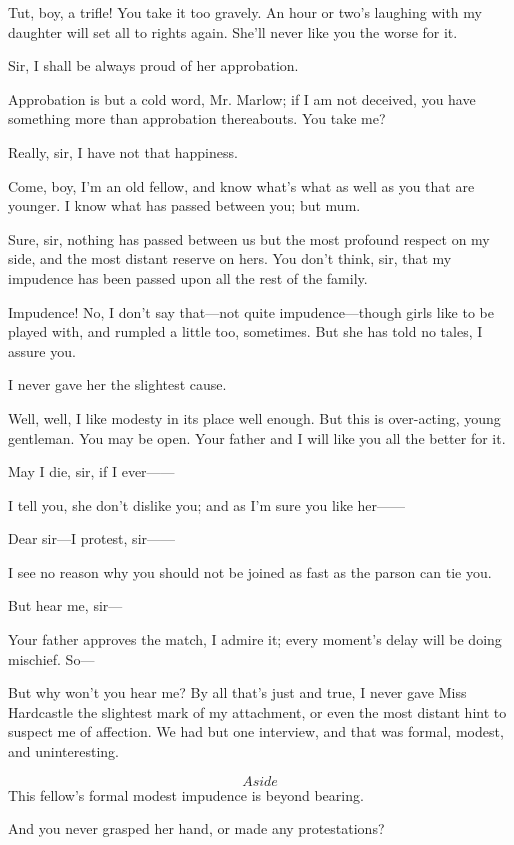 \documentclass{book}
\begin{document}
\3  Tut, boy, a trifle!  You take it too gravely.  An hour or
two's laughing with my daughter will set all to rights again.  She'll
never like you the worse for it.

\2  Sir, I shall be always proud of her approbation.

\3  Approbation is but a cold word, Mr. Marlow; if I am not
deceived, you have something more than approbation thereabouts.  You
take me?

\2  Really, sir, I have not that happiness.

\3  Come, boy, I'm an old fellow, and know what's what as well
as you that are younger.  I know what has passed between you; but mum.

\2  Sure, sir, nothing has passed between us but the most
profound respect on my side, and the most distant reserve on hers.  You
don't think, sir, that my impudence has been passed upon all the rest
of the family.

\3  Impudence!  No, I don't say that---not quite
impudence---though girls like to be played with, and rumpled a little
too, sometimes.  But she has told no tales, I assure you.

\2  I never gave her the slightest cause.

\3  Well, well, I like modesty in its place well enough.  But
this is over-acting, young gentleman.  You may be open.  Your father
and I will like you all the better for it.

\2  May I die, sir, if I ever------

\3  I tell you, she don't dislike you; and as I'm sure you
like her------

\2  Dear sir---I protest, sir------

\3  I see no reason why you should not be joined as fast as
the parson can tie you.

\2  But hear me, sir---

\3  Your father approves the match, I admire it; every
moment's delay will be doing mischief.  So---

\2  But why won't you hear me?  By all that's just and true, I
never gave Miss Hardcastle the slightest mark of my attachment, or even
the most distant hint to suspect me of affection.  We had but one
interview, and that was formal, modest, and uninteresting.

\3  \[Aside\]  This fellow's formal modest impudence is be\-yond
bearing.

\1  And you never grasped her hand, or made any
protestations?
\end{document}
